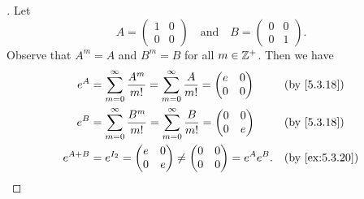 \begin{proof}[]
  Let
  \[
    A = \begin{pmatrix}
      1 & 0 \\
      0 & 0
    \end{pmatrix} \quad \text{and} \quad B = \begin{pmatrix}
      0 & 0 \\
      0 & 1
    \end{pmatrix}.
  \]
  Observe that \(A^m = A\) and \(B^m = B\) for all \(m \in \mathbb{Z}^+\).
  Then we have
  \begin{align*}
    e^A       & = \sum_{m = 0}^\infty \frac{A^m}{m!} = \sum_{m = 0}^\infty \frac{A}{m!} = \begin{pmatrix}
                                                                                            e & 0 \\
                                                                                            0 & 0
                                                                                          \end{pmatrix} &  & \text{(by \cref{5.3.18})}                           \\
    e^B       & = \sum_{m = 0}^\infty \frac{B^m}{m!} = \sum_{m = 0}^\infty \frac{B}{m!} = \begin{pmatrix}
                                                                                            0 & 0 \\
                                                                                            0 & e
                                                                                          \end{pmatrix} &  & \text{(by \cref{5.3.18})}                           \\
    e^{A + B} & = e^{I_2} = \begin{pmatrix}
                              e & 0 \\
                              0 & e
                            \end{pmatrix} \neq \begin{pmatrix}
                                                 0 & 0 \\
                                                 0 & 0
                                               \end{pmatrix} = e^A e^B.                                                        &  & \text{(by \cref{ex:5.3.20})}
  \end{align*}
\end{proof}

